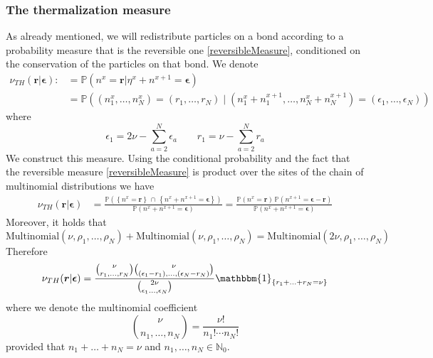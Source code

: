 \documentclass[11pt]{article}
\numberwithin{equation}{section}
\numberwithin{equation}{subsection}
\begin{document}
\subsubsection{The thermalization measure}
As already mentioned, we will redistribute particles on a bond according to a probability measure that is the reversible one \eqref{reversibleMeasure}, conditioned on the conservation of the particles on that bond. We denote
\begin{equation}
	\begin{split}
	\nu_{TH}(\bm{r}|\bm{\epsilon}):&=\mathbb{P}\left(n^{x}=\bm{r}|\eta^{x}+n^{x+1}=\bm{\epsilon}\right)
	\\&
	=\mathbb{P}\left((n_{1}^{x},\ldots,n_{N}^{x})=
	(r_{1},\ldots,r_{N})\;|\;(n_{1}^{x}+n_{1}^{x+1},\ldots,n_{N}^{x}+n_{N}^{x+1})=(\epsilon_{1},\ldots,\epsilon_{N})\right)
	\end{split}
\end{equation}
where
\begin{equation}
	\epsilon_{1}=2\nu-\sum_{a=2}^{N}\epsilon_{a}\qquad r_{1}=\nu-\sum_{a=2}^{N}r_{a}
\end{equation}
We construct this measure. Using the conditional probability and the fact that the reversible measure \eqref{reversibleMeasure} is product over the sites of the chain of multinomial distributions we have
\begin{equation}
	\begin{split}
\nu_{TH}(\bm{r}|\bm{\epsilon})&=\frac{\mathbb{P}\left(\left\{n^{x}=\bm{r}\right\}\,\cap\,\left\{n^{x}+n^{x+1}=\bm{\epsilon}\right\}\right)}{\mathbb{P}\left(n^{x}+n^{x+1}=\bm{\epsilon}\right)}=\frac{\mathbb{P}\left(n^{x}=\bm{r}\right)\,\mathbb{P}\left(n^{x+1}=\bm{\epsilon}-\bm{r}\right)}{\mathbb{P}\left(n^{x}+n^{x+1}=\bm{\epsilon}\right)}
	\end{split}
\end{equation}
Moreover, it holds that 
\begin{equation}
\text{Multinomial}(\nu,\rho_{1},\ldots,\rho_{N})+\text{Multinomial}(\nu,\rho_{1},\ldots,\rho_{N})=\text{Multinomial}(2\nu,\rho_{1},\ldots,\rho_{N})
\end{equation}
Therefore 
\begin{equation}
	\begin{split}
	\nu_{TH}(\bm{r}|\bm{\epsilon})=\frac{\binom{\nu}{r_{1},\ldots,r_{N}}\binom{\nu}{(\epsilon_{1}-r_{1}),\ldots,(\epsilon_{N}-r_{N})}}{\binom{2\nu}{\epsilon_{1}\ldots,\epsilon_{N}}}\mathbbm{1}_{\{r_{1}+\ldots+r_{N}=\nu\}}
	\end{split}
\end{equation}
where we denote the multinomial coefficient
\begin{equation}
	\binom{\nu}{n_{1},\ldots,n_{N}}=\frac{\nu!}{n_{1}!\cdots n_{N}!}
\end{equation}
provided that $n_{1}+\ldots+n_{N}=\nu$ and $n_{1},\ldots,n_{N}\in \mathbb{N}_{0}$. 
\end{document}
